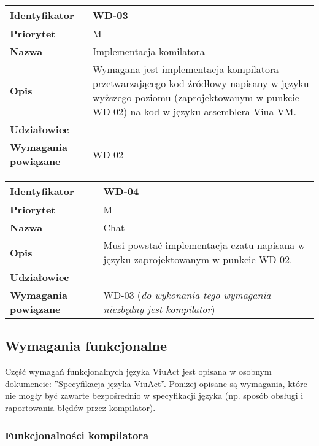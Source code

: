 \vspace{1em}

\begin{tabular}{ | l | l | }
    \hline
    \textbf{Identyfikator} & \parbox[t]{11cm}{WD-03} \\
    \hline
    \textbf{Priorytet} & M \\
    \hline
    \textbf{Nazwa} & Implementacja komilatora \\
    \hline
    \textbf{Opis} & \parbox[t]{11cm}{
        Wymagana jest implementacja kompilatora przetwarzającego kod źródłowy napisany w języku
        wyższego poziomu (zaprojektowanym w punkcie WD-02) na kod w języku assemblera Viua VM.
    } \\
    \hline
    \textbf{Udziałowiec} & \phantom{} \\
    \hline
    \textbf{Wymagania powiązane} & WD-02 \\
    \hline
\end{tabular}

\vspace{1em}

\begin{tabular}{ | l | l | }
    \hline
    \textbf{Identyfikator} & \parbox[t]{11cm}{WD-04} \\
    \hline
    \textbf{Priorytet} & M \\
    \hline
    \textbf{Nazwa} & Chat \\
    \hline
    \textbf{Opis} & \parbox[t]{11cm}{
        Musi powstać implementacja czatu napisana w języku zaprojektowanym w punkcie WD-02.
    } \\
    \hline
    \textbf{Udziałowiec} & \phantom{} \\
    \hline
    \textbf{Wymagania powiązane} & \parbox[t]{11cm}{
        WD-03 (\emph{do wykonania tego wymagania niezbędny jest kompilator})
    } \\
    \hline
\end{tabular}

\subsection{Wymagania funkcjonalne}

Część wymagań funkcjonalnych języka ViuAct jest opisana w osobnym dokumencie: ''Specyfikacja języka ViuAct''.
Poniżej opisane są wymagania, które nie mogły być zawarte bezpośrednio w specyfikacji języka (np. sposób
obsługi i raportowania błędów przez kompilator).

\subsubsection{Funkcjonalności kompilatora}

